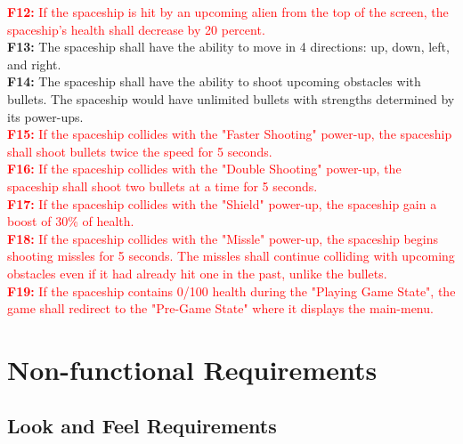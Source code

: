 \documentclass[12pt, titlepage]{article}
\begin{document}
 \newline
\textcolor{red}{ \textbf{F12:} If the spaceship is hit by an upcoming alien from the top of the screen, the spaceship's health shall decrease by 20 percent. }\\
 \newline
 \textbf{F13:} The spaceship shall have the ability to move in 4 directions: up, down, left, and right. \\
 \newline
 \textbf{F14:} The spaceship shall have the ability to shoot upcoming obstacles with bullets. The spaceship would have unlimited bullets with strengths determined by its power-ups. \\
 \newline
\textcolor{red}{\textbf{F15:} If the spaceship collides with the "Faster Shooting" power-up, the spaceship shall shoot bullets twice the speed for 5 seconds.} \\
 \newline
\textcolor{red}{\textbf{F16:} If the spaceship collides with the "Double Shooting" power-up, the spaceship shall shoot two bullets at a time for 5 seconds.}\\
 \newline
\textcolor{red}{\textbf{F17:} If the spaceship collides with the "Shield" power-up, the spaceship gain a boost of 30\% of health.}\\
 \newline
\textcolor{red}{\textbf{F18:} If the spaceship collides with the "Missle" power-up, the spaceship begins shooting missles for 5 seconds. The missles shall continue colliding with upcoming obstacles even if it had already hit one in the past, unlike the bullets.}\\
 \newline
\textcolor{red}{ \textbf{F19:} If the spaceship contains 0/100 health during the "Playing Game State", the game shall redirect to the "Pre-Game State" where it displays the main-menu.}\\


\section{Non-functional Requirements}

\subsection{Look and Feel Requirements}
\end{document}
